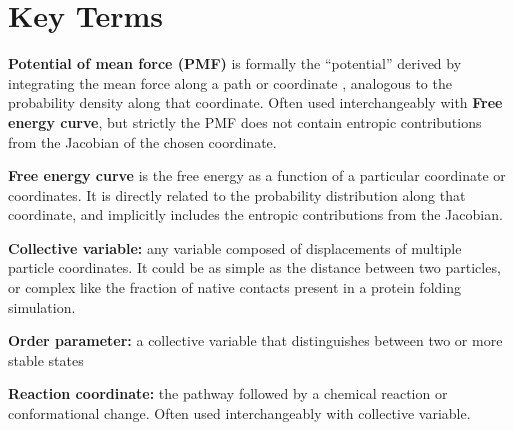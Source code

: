 
\section{Key Terms}

\begin{descripion}

  \item \textbf{Potential of mean force (PMF)} is formally the ``potential'' derived by integrating the mean force along a path or coordinate \cite{Kirkwood-1935}, analogous to the probability density along that coordinate.  Often used interchangeably with \textbf{Free energy curve}, but strictly the PMF does not contain entropic contributions from the Jacobian of the chosen coordinate.

  \item \textbf{Free energy curve} is the free energy as a function of a
  particular coordinate or coordinates.  It is directly related to the
  probability distribution along that coordinate, and implicitly includes the
  entropic contributions from the Jacobian.


  \item \textbf{Collective variable:} any variable composed of displacements of
  multiple particle coordinates.  It could be as simple as the distance between
  two particles, or complex like the fraction of native contacts present in a
  protein folding simulation.

  \item \textbf{Order parameter:}  a collective variable that distinguishes between two or more stable states

  \item \textbf{Reaction coordinate:} the pathway followed by a chemical reaction or conformational change.  Often used interchangeably with collective variable.

\end{descripion}
